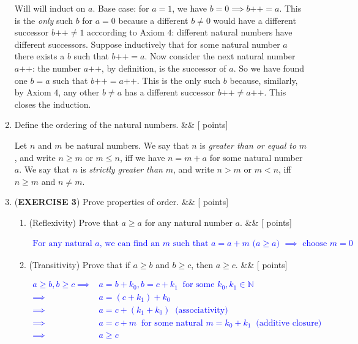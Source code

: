 \documentclass[12pt]{article}
\newcommand{\points}[1]{\hfill {[#1 points]}}
\newcommand{\problem}[2][]{%
  \item {#2}%
  \ifx&#1&%
  \else%
    \points{#1}%
  \fi
  \par\vspace{0.5em}
}
\begin{document}
\begin{enumerate}[leftmargin=*, label=\textbf{\arabic*.}]
{	Will will induct on $a$. Base case: for $a = 1$, we have $b=0 \implies b\text{++} = a$. This is the \textit{only} such $b$ for $a=0$ because a different $b \neq 0$ would have a different successor $b\text{++} \neq 1$ acccording to Axiom $4$: different natural numbers have different successors. Suppose inductively that for some natural number $a$ there exists a $b$ such that $b\text{++} = a$. Now consider the next natural number $a\text{++}$: the number $a\text{++}$, by definition, is the successor of $a$. So we have found one $b=a$ such that $b\text{++} = a\text{++}$. This is the only such $b$ because, similarly, by Axiom $4$, any other $b \neq a$ has a different successor $b\text{++} \neq a\text{++}$. This closes the induction.}
	
	\problem{Define the ordering of the natural numbers.}
	Let $n$ and $m$ be natural numbers. We say that $n$ is \textit{greater than or equal to} $m$, and write $n \geq m$ or $m \leq n$, iff we have $n = m + a$ for some natural number $a$. We say that $n$ is \textit{strictly greater than} $m$, and write $n > m$ or $m < n$, iff $n \geq m$ and $n \neq m$.
	
	\problem{(\textbf{EXERCISE 3}) Prove properties of order.}
	\begin{enumerate}
	
	   \problem{(Reflexivity) Prove that $a \geq a$ for any natural number $a$.}
    	\textcolor{blue}{
	\begin{align*}
	\text{For any natural $a$, we can find an $m$ such that $a = a + m$ ($a \geq a$) $\implies$ choose $m = 0$}
	\end{align*}}
	
	   \problem{(Transitivity) Prove that if $a \geq b$ and $b \geq c$, then $a \geq c$.}
    	\textcolor{blue}{
	\begin{align*}
	a \geq b, b \geq c \implies& a = b + k_0, b = c + k_1 \;\; \text{for some $k_0,k_1 \in \mathbb{N}$}\\
	\implies& a = (c + k_1) + k_0\\
	\implies& a = c + (k_1 + k_0) \;\; \text{(associativity)}\\
	\implies& a = c + m \;\; \text{for some natural $m = k_0 + k_1$} \;\; \text{(additive closure)}\\
	\implies& a \geq c
	\end{align*}}
	

\end{enumerate}
\end{enumerate}
\end{document}
